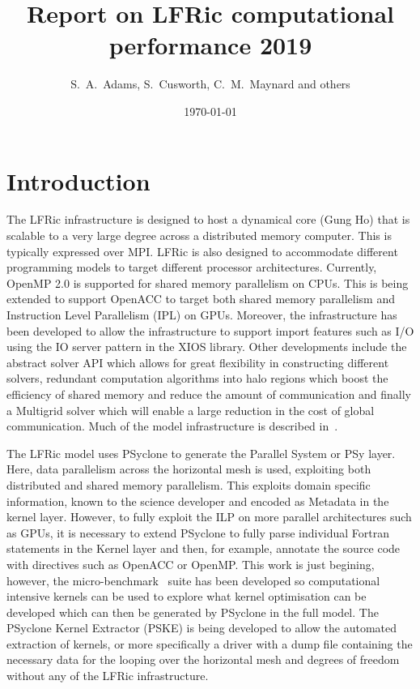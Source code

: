 \documentclass[11pt]{article}
\author{S.~A.~Adams, S.~Cusworth, C.~M.~Maynard and others}
\title{Report on LFRic computational performance 2019}
\date{\today}
\begin{document}
\maketitle
\medskip
\section{Introduction\label{sec:intro}}
The LFRic infrastructure is designed to host a dynamical core (Gung Ho)
that is scalable to a very large degree across a distributed memory
computer. This is typically expressed over MPI. LFRic is also designed
to accommodate different programming models to target different
processor architectures. Currently, OpenMP 2.0 is supported for shared
memory parallelism on CPUs. This is being extended to support OpenACC
to target both shared memory parallelism and Instruction Level
Parallelism (IPL) on GPUs. Moreover, the infrastructure has been
developed to allow the infrastructure to support import features such
as I/O using the IO server pattern in the XIOS library. Other
developments include the abstract solver API which allows for great
flexibility in constructing different solvers, redundant computation
algorithms into halo regions which boost the efficiency of shared
memory and reduce the amount of communication and finally a Multigrid
solver which will enable a large reduction in the cost of global communication.
Much of the model infrastructure is described in~\cite{LFRic}.

The LFRic model uses PSyclone to generate the Parallel System or PSy
layer. Here, data parallelism across the horizontal mesh is used,
exploiting both distributed and shared memory parallelism. This
exploits domain specific information, known to the science developer
and encoded as Metadata in the kernel layer. However, to
fully exploit the ILP on more parallel architectures such as GPUs, it
is necessary to extend PSyclone to fully parse individual Fortran
statements in the Kernel layer and then, for example, annotate the
source code with directives such as OpenACC or OpenMP. This work is just begining,
however, the micro-benchmark~\cite{lfric-microbenchmarks} suite has been developed so computational
intensive kernels can be used to explore what kernel optimisation can
be developed which can then be generated by PSyclone in the full
model. The PSyclone Kernel Extractor (PSKE) is being developed to
allow the automated extraction of kernels, or more specifically a
driver with a dump file containing the necessary data for the looping
over the horizontal mesh and degrees of freedom without any of the
LFRic infrastructure.
\end{document}
